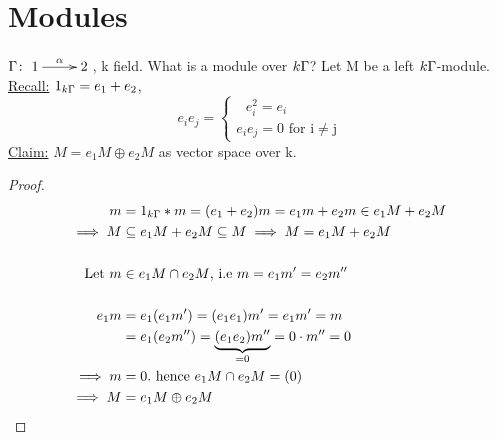 \section{Modules}

\begin{exam}
	$\Gamma\colon \xymatrix{1\ar[r]^\alpha & 2}$, k field. 
	What is a module over $k\Gamma$? Let M be a left $k\Gamma$-module.
	\underline{Recall:} 
	$1_{k\Gamma}=e_1 + e_2$, \[e_ie_j=  
	\begin{cases}	\text{\ $e_i^2 = e_i$}\\
	\text{$e_ie_j = 0$ for i$\neq$j}
	\end{cases}\]
	\underline{Claim:} $M = e_1M\oplus e_2M$ as vector space over k.\\\newline
	\begin{proof}
	
	\begin{align*}
	m &= 1_{k\Gamma}*m=(e_1 + e_2)m = e_1m+e_2m \in e_1M + e_2M\\
	\implies M &\subseteq e_1M + e_2M \subseteq M \implies M = e_1M + e_2M\\\\
	\text{Let } m&\in e_1M \cap e_2M \text{, i.e } m=e_1m'=e_2m''\\\\
	e_1m&=e_1(e_1m')=(e_1e_1)m'=e_1m'=m\\
	&= e_1(e_2m'')=\underbrace{(e_1e_2)m''}_{=0}=0\cdot m''=0\\
	\implies m &=0. \text{ hence } e_1M \cap e_2M = (0)\\
	\implies M &= e_1M \oplus e_2M\\ 
	\end{align*}
\end{proof}
\end{exam}

